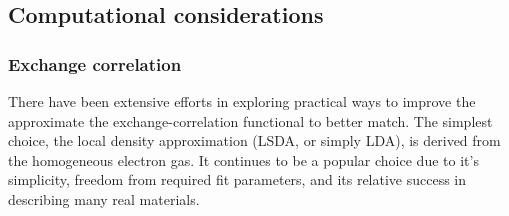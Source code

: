 \subsection{Computational considerations}


\subsubsection{Exchange correlation}

There have been extensive efforts in exploring practical ways to improve
the approximate the exchange-correlation functional to better match. The simplest
choice, the local density approximation (LSDA, or simply LDA), is derived from the
homogeneous electron gas. It continues to be a popular choice due to it's simplicity,
freedom from required fit parameters, and its relative success in describing many
real materials.

